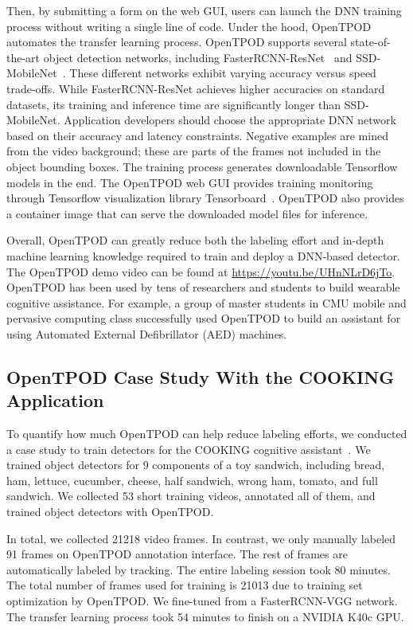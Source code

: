 Then, by submitting a form on the web GUI, users can launch the DNN training
process without writing a single line of code. Under the hood, OpenTPOD automates
the transfer learning process. OpenTPOD supports several state-of-the-art object
detection networks, including FasterRCNN-ResNet~\cite{ren2015faster,He2016} and
SSD-MobileNet~\cite{Liu2016,Howard2017}. These different networks exhibit
varying accuracy versus speed trade-offs. While FasterRCNN-ResNet achieves higher
accuracies on standard datasets, its training and inference time are
significantly longer than SSD-MobileNet. Application developers should choose
the appropriate DNN network based on their accuracy and latency constraints.
Negative examples are mined from the video background; these are parts of the
frames not included in the object bounding boxes.  The training process
generates downloadable Tensorflow models in the end. The OpenTPOD web GUI provides
training monitoring through Tensorflow visualization library
Tensorboard~\cite{tensorflow2017}. OpenTPOD also provides a container image that can
serve the downloaded model files for inference.

Overall, OpenTPOD can greatly reduce both the labeling effort and in-depth
machine learning knowledge required to train and deploy a DNN-based detector.
The OpenTPOD demo video can be found at \url{https://youtu.be/UHnNLrD6jTo}.
OpenTPOD has been used by tens of researchers and students to build wearable
cognitive assistance. For example, a group of master students in CMU mobile and
pervasive computing class successfully used OpenTPOD to build an assistant for
using Automated External Defibrillator (AED) machines.

\subsection{OpenTPOD Case Study With the COOKING Application}

To quantify how much OpenTPOD can help reduce labeling efforts, we conducted a case
study to train detectors for the COOKING cognitive
assistant~\cite{chen2018application}. We trained object detectors for 9
components of a toy sandwich, including bread, ham, lettuce, cucumber, cheese,
half sandwich, wrong ham, tomato, and full sandwich. We collected 53 short
training videos, annotated all of them, and trained object detectors with OpenTPOD.

In total, we collected 21218 video frames. In contrast, we only manually labeled
91 frames on OpenTPOD annotation interface. The rest of frames are automatically
labeled by tracking. The entire labeling session took 80 minutes. The total
number of frames used for training is 21013 due to training set optimization by
OpenTPOD. We fine-tuned from a FasterRCNN-VGG network. The transfer learning process
took 54 minutes to finish on a NVIDIA K40c GPU.


